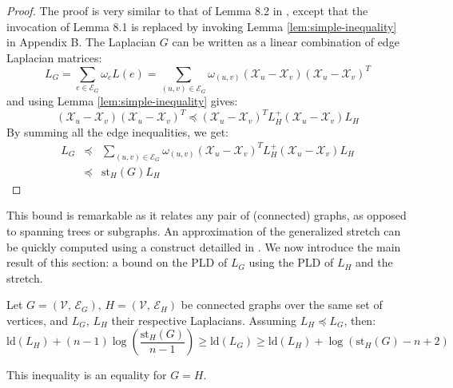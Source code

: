 \begin{proof}The proof is very similar to that of Lemma 8.2 in \cite{Spielman2009b},
except that the invocation of Lemma 8.1 is replaced by invoking Lemma
\ref{lem:simple-inequality} in Appendix B. The Laplacian $G$ can
be written as a linear combination of edge Laplacian matrices:
\[
L_{G}=\sum_{e\in\mathcal{E}_{G}}\omega_{e}L\left(e\right)=\sum_{\left(u,v\right)\in\mathcal{E}_{G}}\omega_{\left(u,v\right)}\left(\mathcal{X}_{u}-\mathcal{X}_{v}\right)\left(\mathcal{X}_{u}-\mathcal{X}_{v}\right)^{T}
\]
and using Lemma \ref{lem:simple-inequality} gives:
\[
\left(\mathcal{X}_{u}-\mathcal{X}_{v}\right)\left(\mathcal{X}_{u}-\mathcal{X}_{v}\right)^{T}\preceq\left(\mathcal{X}_{u}-\mathcal{X}_{v}\right)^{T}L_{H}^{+}\left(\mathcal{X}_{u}-\mathcal{X}_{v}\right)L_{H}
\]
By summing all the edge inequalities, we get:
\begin{eqnarray*}
L_{G} & \preceq & \sum_{\left(u,v\right)\in\mathcal{E}_{G}}\omega_{\left(u,v\right)}\left(\mathcal{X}_{u}-\mathcal{X}_{v}\right)^{T}L_{H}^{+}\left(\mathcal{X}_{u}-\mathcal{X}_{v}\right)L_{H}\\
 & \preceq & \text{st}_{H}\left(G\right)L_{H}
\end{eqnarray*}


\end{proof}

This bound is remarkable as it relates any pair of (connected) graphs,
as opposed to spanning trees or subgraphs. An approximation of the
generalized stretch can be quickly computed using a construct detailled
in \cite{Spielman2009}. We now introduce the main result of this
section: a bound on the PLD of $L_{G}$ using the PLD of $L_{H}$
and the stretch.

\begin{theorem}\label{thm:stretch-pld-bounds}Let $G=\left(\mathcal{V},\,\mathcal{E}_{G}\right),\, H=\left(\mathcal{V},\,\mathcal{E}_{H}\right)$
be connected graphs over the same set of vertices, and $L_{G}$, $L_{H}$
their respective Laplacians. Assuming $L_{H}\preceq L_{G}$, then:
\begin{equation}
\text{ld}\left(L_{H}\right)+\left(n-1\right)\log\left(\frac{\text{st}_{H}\left(G\right)}{n-1}\right)\geq\text{ld}\left(L_{G}\right)\geq\text{ld}\left(L_{H}\right)+\log\left(\text{st}_{H}\left(G\right)-n+2\right)\label{eq:encadrement-1}
\end{equation}


This inequality is an equality for $G=H$.

\end{theorem}

